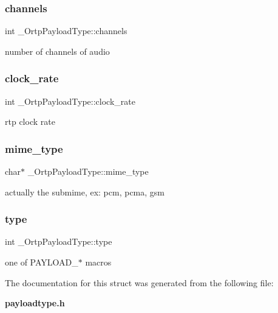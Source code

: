 \subsubsection{channels}
{\footnotesize\ttfamily int \+\_\+\+Ortp\+Payload\+Type\+::channels}

number of channels of audio \mbox{\label{struct__OrtpPayloadType_a020ebbacab34872cfdffc7a5cddf6aa8}} 
\subsubsection{clock\+\_\+rate}
{\footnotesize\ttfamily int \+\_\+\+Ortp\+Payload\+Type\+::clock\+\_\+rate}

rtp clock rate \mbox{\label{struct__OrtpPayloadType_aca553824693e8dcf4a6181a4310c0d11}} 
\subsubsection{mime\+\_\+type}
{\footnotesize\ttfamily char$\ast$ \+\_\+\+Ortp\+Payload\+Type\+::mime\+\_\+type}

actually the submime, ex\+: pcm, pcma, gsm \mbox{\label{struct__OrtpPayloadType_a5e2888d66a1bc98be34fb3bca55f88d2}} 
\subsubsection{type}
{\footnotesize\ttfamily int \+\_\+\+Ortp\+Payload\+Type\+::type}

one of P\+A\+Y\+L\+O\+A\+D\+\_\+$\ast$ macros 

The documentation for this struct was generated from the following file\+:\begin{DoxyCompactItemize}
\item 
\textbf{ payloadtype.\+h}\end{DoxyCompactItemize}

